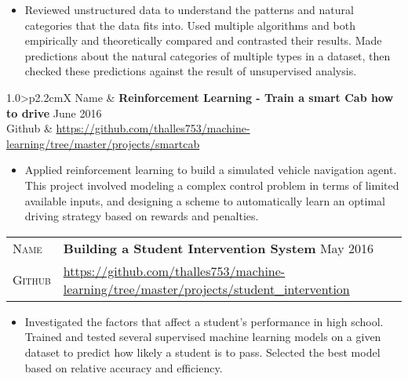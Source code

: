 \documentclass[10pt, a4paper, oneside, final]{scrartcl} %
\newcommand{\gray}{\rowcolor[gray]{.90}} %
\begin{document}
\begin{itemize}\itemsep1.5pt
\item Reviewed unstructured data to understand the patterns and natural categories that the data fits into.
Used multiple algorithms and both empirically and theoretically compared and contrasted their results.
Made predictions about the natural categories of multiple types in a dataset, then checked these
predictions against the result of unsupervised analysis.
\end{itemize}

\begin{center}
\begin{tabularx}{1.0\linewidth}{>{\raggedleft\scshape}p{2.2cm}X}
\gray Name & \textbf{Reinforcement Learning - Train a smart Cab how to drive} \hfill June 2016\\
\gray Github & \url{https://github.com/thalles753/machine-learning/tree/master/projects/smartcab}\\
\end{tabularx}
\end{center}

\begin{itemize}\itemsep1.5pt
\item Applied reinforcement learning to build a simulated vehicle navigation agent. This project involved
modeling a complex control problem in terms of limited available inputs, and designing a scheme to
automatically learn an optimal driving strategy based on rewards and penalties.
\end{itemize}

\begin{center}
\begin{tabularx}{1.0\linewidth}{>{\raggedleft\scshape}p{2.2cm}X}
\gray Name & \textbf{Building a Student Intervention System} \hfill May 2016\\
\gray Github & \url{https://github.com/thalles753/machine-learning/tree/master/projects/student_intervention}\\
\end{tabularx}
\end{center}

\begin{itemize}\itemsep1.5pt
\item Investigated the factors that affect a student's performance in high school. Trained and tested several supervised machine learning models on a given dataset to predict how likely a student is to pass. Selected the best model based on relative accuracy and efficiency.
\end{itemize}
\end{document}
